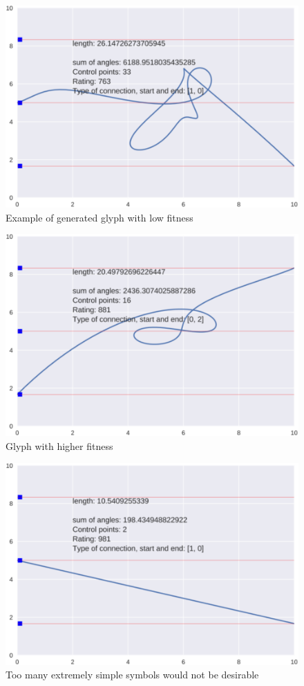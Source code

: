 \documentclass{vgtc}                          %
\begin{document}
\begin{figure}[tbp]
\centering
        \includegraphics[width=0.75\hsize]{e1.pdf}
\caption{Example of generated glyph with low fitness}
\end{figure}
\begin{figure}[tbp]
\centering
        \includegraphics[width=0.75\hsize]{e3.pdf}
\caption{Glyph with higher fitness      }
\end{figure}
\begin{figure}[tbp]
\centering
        \includegraphics[width=0.75\hsize]{e4.pdf}
\caption{Too many extremely simple symbols would not be desirable}
\end{figure}
\end{document}
